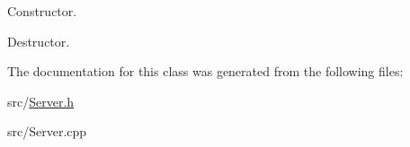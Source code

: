 Constructor. 

Destructor. 

The documentation for this class was generated from the following files\-:\begin{DoxyCompactItemize}
\item 
src/\hyperlink{_server_8h}{Server.\-h}\item 
src/Server.\-cpp\end{DoxyCompactItemize}
